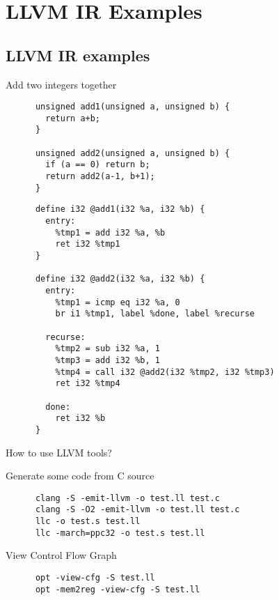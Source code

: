 \documentclass[8pt]{beamer}
\begin{document}
\section[Examples]{LLVM IR Examples}
\subsection*{LLVM IR examples}

\begin{frame}[fragile]{Add two integers together}
  \begin{exampleblock}{}
    \begin{verbatim}
      unsigned add1(unsigned a, unsigned b) {
        return a+b;
      }

      unsigned add2(unsigned a, unsigned b) {
        if (a == 0) return b;
        return add2(a-1, b+1);
      }
    \end{verbatim}
  \end{exampleblock}

  \begin{exampleblock}{}
    \begin{verbatim}
      define i32 @add1(i32 %a, i32 %b) {
        entry:
          %tmp1 = add i32 %a, %b
          ret i32 %tmp1
      }

      define i32 @add2(i32 %a, i32 %b) {
        entry:
          %tmp1 = icmp eq i32 %a, 0
          br i1 %tmp1, label %done, label %recurse

        recurse:
          %tmp2 = sub i32 %a, 1
          %tmp3 = add i32 %b, 1
          %tmp4 = call i32 @add2(i32 %tmp2, i32 %tmp3)
          ret i32 %tmp4

        done:
          ret i32 %b
      }
    \end{verbatim}
  \end{exampleblock}
\end{frame}

\begin{frame}[fragile]{How to use LLVM tools?}
  \begin{block}{Generate some code from C source}
    \begin{verbatim}
      clang -S -emit-llvm -o test.ll test.c
      clang -S -O2 -emit-llvm -o test.ll test.c
      llc -o test.s test.ll
      llc -march=ppc32 -o test.s test.ll
    \end{verbatim}
  \end{block}

  \begin{block}{View Control Flow Graph}
    \begin{verbatim}
      opt -view-cfg -S test.ll
      opt -mem2reg -view-cfg -S test.ll
    \end{verbatim}
  \end{block}
\end{frame}
\end{document}
